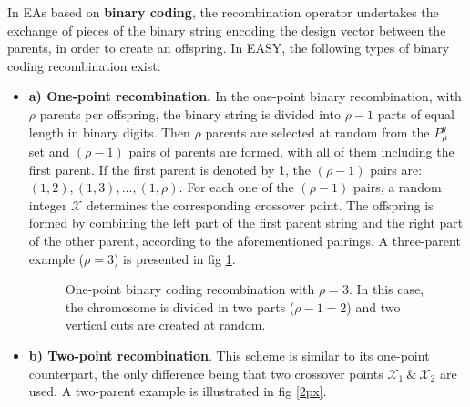 In EAs based on {\bf binary coding}, the recombination operator undertakes the exchange of pieces of the binary string encoding the design vector between the parents, in order to create an offspring. In EASY, the following types of binary coding recombination exist:
\begin{itemize}
\item[]{\bf a) One-point recombination.} 
In the one-point binary recombination, with $\rho$ parents per offspring, the binary string is divided into $\rho-1$ parts of equal length in binary digits. Then $\rho$ parents are selected at random from the $P_{\mu}^{g}$ set and $(\rho-1)$ pairs of parents are formed, with all of them including the first parent. If the first parent is denoted by 1, the $(\rho-1)$ pairs are: $(1,2),(1,3),...,(1,\rho)$. 
For each one of the $(\rho-1)$ pairs, a random integer $\mathcal{X}$ determines the corresponding crossover point. The offspring is formed by combining the left part of the first parent string and the right part of the other parent, according to the aforementioned pairings. A three-parent example ($\rho=3$) is presented in fig \ref{1px}.
\begin{figure}[h!]
\begin{minipage}[b]{1.0\linewidth}
 \centering
\end{minipage}
\caption{One-point binary coding recombination with $\rho=3$. In this case, the chromosome is divided in two parts ($\rho-1 = 2$) and two vertical cuts are created at random.} 
\label{1px}
\end{figure}

\FloatBarrier
\item[]{\bf b) Two-point recombination}. This scheme is similar to its one-point counterpart, the only difference being that two crossover points $\mathcal{X}_1~\&~\mathcal{X}_2$ are used. A two-parent example is illustrated in fig \ref{2px}.


\end{itemize}
